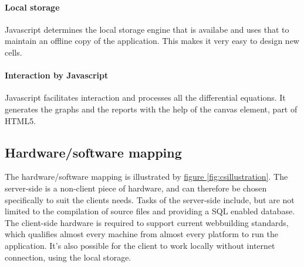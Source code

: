 \documentclass{report}
\begin{document}
				\paragraph{Local storage}
					Javascript determines the local storage engine that is availabe and uses that to maintain an offline copy of the application. This makes it very easy to design new cells. 
				\paragraph{Interaction by Javascript}
					Javascript facilitates interaction and processes all the differential equations. It generates the graphs and the reports with the help of the canvas element, part of HTML5.

		\subsection{Hardware/software mapping}
			The hardware/software mapping is illustrated by \hyperref[fig:csillustration]{figure \ref*{fig:csillustration}}. The server-side is a non-client piece of hardware, and can therefore be chosen specifically to suit the clients needs. Tasks of the server-side include, but are not limited to the compilation of source files and providing a SQL enabled database. The client-side hardware is required to support current webbuilding standards, which qualifies almost every machine from almost every platform to run the application. It's also possible for the client to work locally without internet connection, using the local storage.\\
\end{document}
